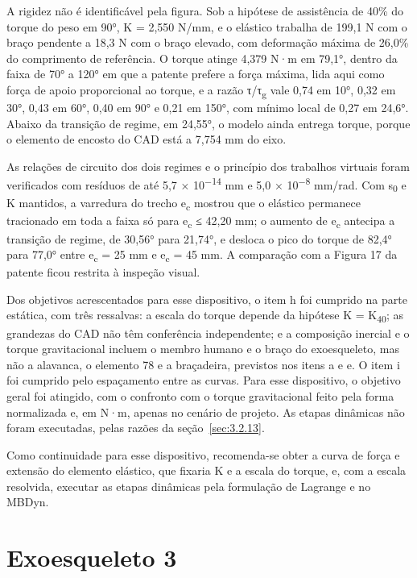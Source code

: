 A rigidez não é identificável pela figura. Sob a hipótese de assistência de 40\% do torque do peso em 90°, K = 2,550 N/mm, e o elástico trabalha de 199,1 N com o braço pendente a 18,3 N com o braço elevado, com deformação máxima de 26,0\% do comprimento de referência. O torque atinge 4,379 N·m em 79,1°, dentro da faixa de 70° a 120° em que a patente prefere a força máxima, lida aqui como força de apoio proporcional ao torque, e a razão τ/τ\textsubscript{g} vale 0,74 em 10°, 0,32 em 30°, 0,43 em 60°, 0,40 em 90° e 0,21 em 150°, com mínimo local de 0,27 em 24,6°. Abaixo da transição de regime, em 24,55°, o modelo ainda entrega torque, porque o elemento de encosto do CAD está a 7,754 mm do eixo.

As relações de circuito dos dois regimes e o princípio dos trabalhos virtuais foram verificados com resíduos de até 5,7 × 10\textsuperscript{−14} mm e 5,0 × 10\textsuperscript{−8} mm/rad. Com s\textsubscript{0} e K mantidos, a varredura do trecho e\textsubscript{c} mostrou que o elástico permanece tracionado em toda a faixa só para e\textsubscript{c} ≤ 42,20 mm; o aumento de e\textsubscript{c} antecipa a transição de regime, de 30,56° para 21,74°, e desloca o pico do torque de 82,4° para 77,0° entre e\textsubscript{c} = 25 mm e e\textsubscript{c} = 45 mm. A comparação com a Figura 17 da patente ficou restrita à inspeção visual.

Dos objetivos acrescentados para esse dispositivo, o item h foi cumprido na parte estática, com três ressalvas: a escala do torque depende da hipótese K = K\textsubscript{40}; as grandezas do CAD não têm conferência independente; e a composição inercial e o torque gravitacional incluem o membro humano e o braço do exoesqueleto, mas não a alavanca, o elemento 78 e a braçadeira, previstos nos itens a e e. O item i foi cumprido pelo espaçamento entre as curvas. Para esse dispositivo, o objetivo geral foi atingido, com o confronto com o torque gravitacional feito pela forma normalizada e, em N·m, apenas no cenário de projeto. As etapas dinâmicas não foram executadas, pelas razões da seção~\ref{sec:3.2.13}.

Como continuidade para esse dispositivo, recomenda-se obter a curva de força e extensão do elemento elástico, que fixaria K e a escala do torque, e, com a escala resolvida, executar as etapas dinâmicas pela formulação de Lagrange e no MBDyn.

\section{Exoesqueleto 3}\label{sec:5.3}

